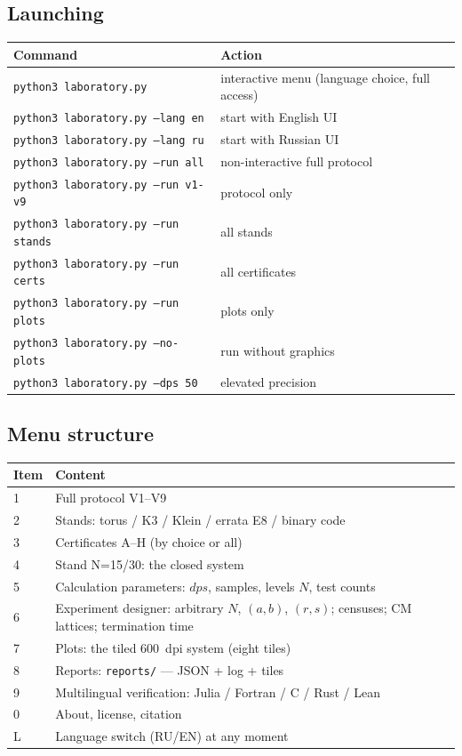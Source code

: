 \subsection{Launching}

\begin{center}
\small
\begin{tabularx}{\textwidth}{@{}l >{\raggedright\arraybackslash}X@{}}
\toprule
Command & Action \\
\midrule
\texttt{python3 laboratory.py} & interactive menu (language choice,
full access) \\
\texttt{python3 laboratory.py --lang en} & start with English UI \\
\texttt{python3 laboratory.py --lang ru} & start with Russian UI \\
\texttt{python3 laboratory.py --run all} & non-interactive full
protocol \\
\texttt{python3 laboratory.py --run v1-v9} & protocol only \\
\texttt{python3 laboratory.py --run stands} & all stands \\
\texttt{python3 laboratory.py --run certs} & all certificates \\
\texttt{python3 laboratory.py --run plots} & plots only \\
\texttt{python3 laboratory.py --no-plots} & run without graphics \\
\texttt{python3 laboratory.py --dps 50} & elevated precision \\
\bottomrule
\end{tabularx}
\end{center}

\subsection{Menu structure}

\begin{center}
\small
\begin{tabularx}{\textwidth}{@{}l >{\raggedright\arraybackslash}X@{}}
\toprule
Item & Content \\
\midrule
1 & Full protocol V1--V9 \\
2 & Stands: torus / K3 / Klein / errata E8 / binary code \\
3 & Certificates A--H (by choice or all) \\
4 & Stand N=15/30: the closed system \\
5 & Calculation parameters: $dps$, samples, levels $N$, test
counts \\
6 & Experiment designer: arbitrary $N$, $(a,b)$, $(r,s)$; censuses;
  CM lattices; termination time \\
7 & Plots: the tiled $600$~dpi system (eight tiles) \\
8 & Reports: \texttt{reports/} --- JSON + log + tiles \\
9 & Multilingual verification: Julia / Fortran / C / Rust / Lean \\
0 & About, license, citation \\
L & Language switch (RU/EN) at any moment \\
\bottomrule
\end{tabularx}
\end{center}

